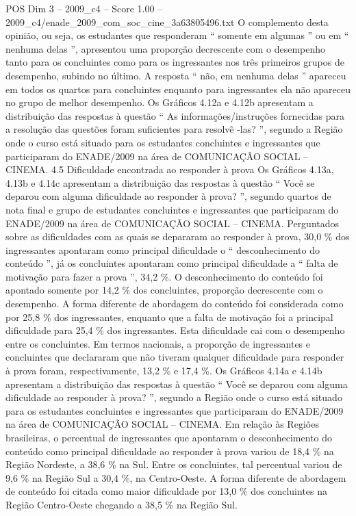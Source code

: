 \begin{textsample}{POS Dim 3 – 2009\_c4 – Score 1.00 – 2009\_c4/enade\_2009\_com\_soc\_cine\_3a63805496.txt}
O complemento desta opinião, ou seja, os estudantes que responderam “ somente em algumas ” ou em “ nenhuma delas ”, apresentou uma proporção decrescente com o desempenho tanto para os concluintes como para os ingressantes nos três primeiros grupos de desempenho, subindo no último.
A resposta “ não, em nenhuma delas ” apareceu em todos os quartos para concluintes enquanto para ingressantes ela não apareceu no grupo de melhor desempenho.
Os Gráficos 4.12a e 4.12b apresentam a distribuição das respostas à questão “ As informações/instruções fornecidas para a resolução das questões foram suficientes para resolvê -las? ”, segundo a Região onde o curso está situado para os estudantes concluintes e ingressantes que participaram do ENADE/2009 na área de COMUNICAÇÃO SOCIAL – CINEMA. 4.5 Dificuldade encontrada ao responder à prova Os Gráficos 4.13a, 4.13b e 4.14c apresentam a distribuição das respostas à questão “ Você se deparou com alguma dificuldade ao responder à prova? ”, segundo quartos de nota final e grupo de estudantes concluintes e ingressantes que participaram do ENADE/2009 na área de COMUNICAÇÃO SOCIAL – CINEMA.
Perguntados sobre as dificuldades com as quais se depararam ao responder à prova, 30,0 \% dos ingressantes apontaram como principal dificuldade o “ desconhecimento do conteúdo ”, já os concluintes apontaram como principal dificuldade a “ falta de motivação para fazer a prova ”, 34,2 \%.
O desconhecimento do conteúdo foi apontado somente por 14,2 \% dos concluintes, proporção decrescente com o desempenho.
A forma diferente de abordagem do conteúdo foi considerada como por 25,8 \% dos ingressantes, enquanto que a falta de motivação foi a principal dificuldade para 25,4 \% dos ingressantes.
Esta dificuldade cai com o desempenho entre os concluintes.
Em termos nacionais, a proporção de ingressantes e concluintes que declararam que não tiveram qualquer dificuldade para responder à prova foram, respectivamente, 13,2 \% e 17,4 \%.
Os Gráficos 4.14a e 4.14b apresentam a distribuição das respostas à questão “ Você se deparou com alguma dificuldade ao responder à prova? ”, segundo a Região onde o curso está situado para os estudantes concluintes e ingressantes que participaram do ENADE/2009 na área de COMUNICAÇÃO SOCIAL – CINEMA.
Em relação às Regiões brasileiras, o percentual de ingressantes que apontaram o desconhecimento do conteúdo como principal dificuldade ao responder à prova variou de 18,4 \% na Região Nordeste, a 38,6 \% na Sul.
Entre os concluintes, tal percentual variou de 9,6 \% na Região Sul a 30,4 \%, na Centro-Oeste.
A forma diferente de abordagem de conteúdo foi citada como maior dificuldade por 13,0 \% dos concluintes na Região Centro-Oeste chegando a 38,5 \% na Região Sul.

\end{textsample}
